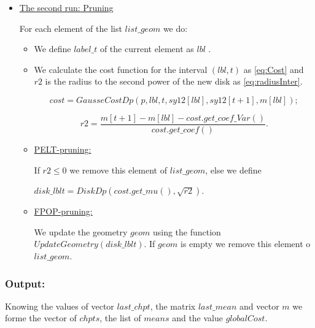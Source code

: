 \documentclass{report}
\begin{document}
\begin{itemize}
	\item \underline {The second run: Pruning}
	
	For each element of the list $list\_geom$ we do:
	
	\begin{itemize}
		\item We define $label\_t$  of the current element as $lbl$  .
		\item We calculate the cost function for the interval $(lbl,t)$ as \ref{eq:Cost} and $r2$ is the radius to the second power of the new disk as \ref{eq:radiusInter}.
		
		\begin{equation}
		cost = GausseCostDp(p, lbl, t, sy12[lbl], sy12[t+1], m[lbl]);
			\label{eq:Cost}
		\end{equation}
		
		\begin{equation}
			r2= \frac {m[t + 1] - m[lbl] - cost.get\_coef\_Var()}{   cost.get\_coef()}.
			\label{eq:radiusInter}
		\end{equation}
		
		
		 \item \underline {PELT-pruning:} 
		 
		 If $r2 \le 0$ we remove this element of $list\_geom$, else we define
		 
		  $disk\_lblt = DiskDp(cost.get\_mu(), \sqrt{r2})$.
		
		
		
		\item \underline {FPOP-pruning:} 
		
		We update the geometry $geom$ using the function $UpdateGeometry(disk\_lblt)$. If  $geom$ is empty we remove this element o $list\_geom$. 	
	\end{itemize} 
\end{itemize} 
	
\subsubsection*{Output:}

Knowing the values of  vector  $last\_chpt$, the matrix $last\_mean$ and vector  $m$ we forme the vector of $chpts$, the list of $means$ and the value $globalCost$.
	
\end{document}
